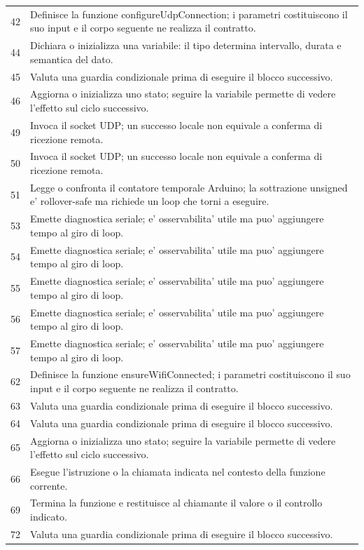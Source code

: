 \documentclass[11pt,a4paper]{article}
\begin{document}
\begin{longtable}{p{}p{}}
42 & Definisce la funzione configureUdpConnection; i parametri costituiscono il suo input e il corpo seguente ne realizza il contratto. \\
44 & Dichiara o inizializza una variabile: il tipo determina intervallo, durata e semantica del dato. \\
45 & Valuta una guardia condizionale prima di eseguire il blocco successivo. \\
46 & Aggiorna o inizializza uno stato; seguire la variabile permette di vedere l'effetto sul ciclo successivo. \\
49 & Invoca il socket UDP; un successo locale non equivale a conferma di ricezione remota. \\
50 & Invoca il socket UDP; un successo locale non equivale a conferma di ricezione remota. \\
51 & Legge o confronta il contatore temporale Arduino; la sottrazione unsigned e' rollover-safe ma richiede un loop che torni a eseguire. \\
53 & Emette diagnostica seriale; e' osservabilita' utile ma puo' aggiungere tempo al giro di loop. \\
54 & Emette diagnostica seriale; e' osservabilita' utile ma puo' aggiungere tempo al giro di loop. \\
55 & Emette diagnostica seriale; e' osservabilita' utile ma puo' aggiungere tempo al giro di loop. \\
56 & Emette diagnostica seriale; e' osservabilita' utile ma puo' aggiungere tempo al giro di loop. \\
57 & Emette diagnostica seriale; e' osservabilita' utile ma puo' aggiungere tempo al giro di loop. \\
62 & Definisce la funzione ensureWifiConnected; i parametri costituiscono il suo input e il corpo seguente ne realizza il contratto. \\
63 & Valuta una guardia condizionale prima di eseguire il blocco successivo. \\
64 & Valuta una guardia condizionale prima di eseguire il blocco successivo. \\
65 & Aggiorna o inizializza uno stato; seguire la variabile permette di vedere l'effetto sul ciclo successivo. \\
66 & Esegue l'istruzione o la chiamata indicata nel contesto della funzione corrente. \\
69 & Termina la funzione e restituisce al chiamante il valore o il controllo indicato. \\
72 & Valuta una guardia condizionale prima di eseguire il blocco successivo. \\

\end{longtable}
\end{document}
